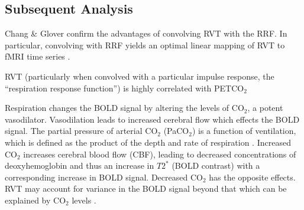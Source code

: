\documentclass[twoside,twocolumn]{article}
\begin{document}
\subsection{Subsequent Analysis}

Chang \& Glover \cite{Chang2009} confirm the advantages of convolving RVT with the RRF.  In particular, convolving with RRF yields an optimal linear mapping of RVT to fMRI time series \cite{Chang2009}.
 
RVT (particularly when convolved with a particular impulse response, the “respiration response function”) is highly correlated with PETCO$_2$

Respiration changes the BOLD signal by altering the levels of CO$_2$, a potent vasodilator.  Vasodilation leads to increased cerebral flow which effects the BOLD signal.  The partial pressure of arterial CO$_2$ (PaCO$_2$) is a function of ventilation, which is defined as the product of the depth and rate of respiration \cite{Birn1993}.  Increased CO$_2$ increases cerebral blood flow (CBF), leading to decreased concentrations of deoxyhemoglobin and thus an increase in $T2^*$ (BOLD contrast) with a corresponding increase in BOLD signal.  Decreased CO$_2$ has the opposite effects.  RVT may account for variance in the BOLD signal beyond that which can be explained by CO$_2$ levels \cite{Chang2009}.
\end{document}
